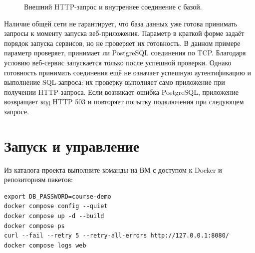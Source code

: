 \begin{figure}[!htb]
  \centering
  \caption{Внешний HTTP-запрос и внутреннее соединение с базой.}
  \label{fig:compose-network}
\end{figure}

Наличие общей сети не гарантирует, что база данных уже готова принимать запросы к моменту запуска веб-приложения. Параметр  в краткой форме задаёт порядок запуска сервисов, но не проверяет их готовность. В данном примере параметр  проверяет, принимает ли PostgreSQL соединения по TCP. Благодаря условию  веб-сервис запускается только после успешной проверки. Однако готовность принимать соединения ещё не означает успешную аутентификацию и выполнение SQL-запроса: их проверку выполняет само приложение при получении HTTP-запроса. Если возникает ошибка PostgreSQL, приложение возвращает код HTTP 503 и повторяет попытку подключения при следующем запросе.

\section{Запуск и управление}

\par\addvspace{10pt}\noindent\begin{minipage}{\linewidth}
\setlength{\parindent}{0pt}\noindent\hspace*{1.25cm}Из каталога проекта выполните команды на ВМ с доступом к Docker и репозиториям пакетов:\par\kern 10pt
\begin{verbatim}
export DB_PASSWORD=course-demo
docker compose config --quiet
docker compose up -d --build
docker compose ps
curl --fail --retry 5 --retry-all-errors http://127.0.0.1:8080/
docker compose logs web
\end{verbatim}
\end{minipage}\par\addvspace{10pt}


